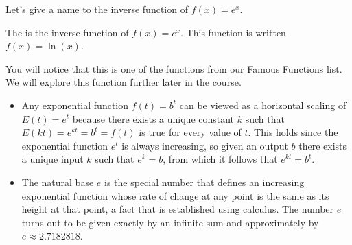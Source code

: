 \documentclass[nooutcomes]{ximera}
\begin{document}
Let's give a name to the inverse function of $f(x)=e^x$.

\begin{definition}
The  is the inverse function of $f(x)=e^x$.  This function is written $f(x)=\ln(x)$.
\end{definition}

You will notice that this is one of the functions from our Famous Functions list.  We will explore this function further later in the course.

\begin{summary}\begin{itemize}
\item Any exponential function \(f(t) = b^t\) can be viewed as a horizontal scaling of \(E(t) = e^t\) because there exists a unique constant \(k\) such that \(E(kt) = e^{kt} = b^t = f(t)\) is true for every value of \(t\).  This holds since the exponential function \(e^t\) is always increasing, so given an output \(b\) there exists a unique input \(k\) such that \(e^k = b\), from which it follows that \(e^{kt} = b^t\).
\item The natural base \(e\) is the special number that defines an increasing exponential function whose rate of change at any point is the same as its height at that point, a fact that is established using calculus.  The number \(e\) turns out to be given exactly by an infinite sum and approximately by \(e \approx 2.7182818\).
\end{itemize}\end{summary}
\end{document}
